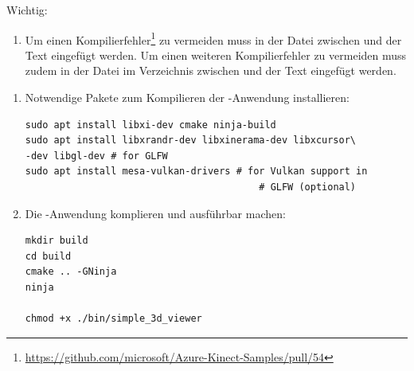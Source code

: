 \begin{enumerate}[label*=\arabic*.]
\begin{enumerate}[label*=\arabic*.]
\begin{redbox}{Wichtig:}
\begin{enumerate}[label=\arabic*.]
                        \item Um einen Kompilierfehler\footnote{\label{fn:pull_request_54}\href{https://github.com/microsoft/Azure-Kinect-Samples/pull/54}{https://github.com/microsoft/Azure-Kinect-Samples/pull/54}} zu vermeiden muss in der Datei  zwischen  und  der Text  eingefügt werden. Um einen weiteren Kompilierfehler zu vermeiden muss zudem in der Datei  im Verzeichnis  zwischen  und  der Text  eingefügt werden.
                        \setcounter{bt_wichtig}{\value{enumiii}}
                    \end{enumerate}
                \end{redbox}

                \begin{redbox}{}
                    \begin{enumerate}[label=\arabic*.]
                        \setcounter{enumiii}{\value{bt_wichtig}}
                        \item Notwendige Pakete zum Kompilieren der -Anwendung installieren:
                            \begin{lstlisting}[style=bash]
sudo apt install libxi-dev cmake ninja-build
sudo apt install libxrandr-dev libxinerama-dev libxcursor\
-dev libgl-dev # for GLFW
sudo apt install mesa-vulkan-drivers # for Vulkan support in
                                         # GLFW (optional)
                            \end{lstlisting}

                        \item Die -Anwendung komplieren und ausführbar machen:
                            \begin{lstlisting}[style=bash]
mkdir build
cd build
cmake .. -GNinja
ninja

chmod +x ./bin/simple_3d_viewer
                            \end{lstlisting}
                    \end{enumerate}
                \end{redbox}


\end{enumerate}
\end{enumerate}
